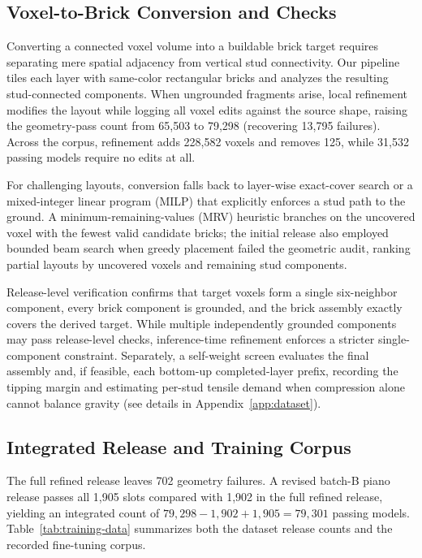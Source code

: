 \documentclass[letterpaper]{article} %
\begin{document}
\subsection{Voxel-to-Brick Conversion and Checks}
Converting a connected voxel volume into a buildable brick target requires separating mere spatial adjacency from vertical stud connectivity. Our pipeline tiles each layer with same-color rectangular bricks and analyzes the resulting stud-connected components. When ungrounded fragments arise, local refinement modifies the layout while logging all voxel edits against the source shape, raising the geometry-pass count from 65,503 to 79,298 (recovering 13,795 failures). Across the corpus, refinement adds 228,582 voxels and removes 125, while 31,532 passing models require no edits at all.

For challenging layouts, conversion falls back to layer-wise exact-cover search or a mixed-integer linear program (MILP) that explicitly enforces a stud path to the ground. A minimum-remaining-values (MRV) heuristic branches on the uncovered voxel with the fewest valid candidate bricks; the initial release also employed bounded beam search when greedy placement failed the geometric audit, ranking partial layouts by uncovered voxels and remaining stud components.

Release-level verification confirms that target voxels form a single six-neighbor component, every brick component is grounded, and the brick assembly exactly covers the derived target. While multiple independently grounded components may pass release-level checks, inference-time refinement enforces a stricter single-component constraint. Separately, a self-weight screen evaluates the final assembly and, if feasible, each bottom-up completed-layer prefix, recording the tipping margin and estimating per-stud tensile demand when compression alone cannot balance gravity (see details in Appendix~\ref{app:dataset}).

\subsection{Integrated Release and Training Corpus}
The full refined release leaves 702 geometry failures. A revised batch-B piano release passes all 1,905 slots compared with 1,902 in the full refined release, yielding an integrated count of $79{,}298-1{,}902+1{,}905=79{,}301$ passing models. Table~\ref{tab:training-data} summarizes both the dataset release counts and the recorded fine-tuning corpus.

\end{document}
